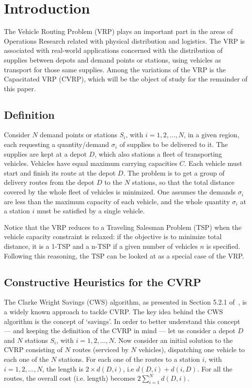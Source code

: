 \section{Introduction}
\label{sec:intro}

The Vehicle Routing Problem (VRP) plays an important part in the areas of 
Operations Research related with physical distribution and logistics. The VRP is 
associated with real-world applications concerned with the distribution of 
supplies between depots and demand points or stations, using vehicles as transport for 
those same supplies. Among the variations of the VRP is 
the Capacitated VRP (CVRP), which will be the object of study for the remainder 
of this paper.

\subsection{Definition}
\label{subsec:definition}

Consider $N$ demand points or stations $S_i$, with $i = 1, 2, ..., N$, in a 
given region, each requesting a 
quantity\slash demand $\sigma_i$ of supplies to be 
delivered to it. The supplies are kept at a depot $D$, which also stations a 
fleet of transporting vehicles. Vehicles have equal maximum carrying capacities 
$C$. Each vehicle must start and finish its route at the depot $D$. The 
problem is to get a group of delivery routes from the depot $D$ to the $N$ 
stations, so that the total distance covered by the whole fleet of 
vehicles is minimized. One assumes the demands $\sigma_i$ are less than the maximum 
capacity of each vehicle, and the whole quantity $\sigma_i$ at a station $i$ 
must be satisfied by a single vehicle.\vertbreak

Notice that the VRP reduces to a Traveling Salesman Problem (TSP) when the 
vehicle capacity constraint is relaxed: if the objective is to minimize 
total distance, it is a 1-TSP and a n-TSP if a given number of vehicles $n$ is 
specified. Following this reasoning, the TSP can be looked at as a special case 
of the VRP.

\subsection{Constructive Heuristics for the CVRP}
\label{subsec:constructive}

The Clarke Wright 
Savings (CWS) algorithm, as presented in Section 5.2.1 of~\cite{Toth2002}, 
is a widely known approach to tackle CVRP. The 
key idea behind the CWS algorithm is the concept of `savings'. In order to 
better understand this concept --- and keeping the definition of the 
CVRP in mind --- let us consider a depot $D$ and $N$ stations $S_i$, with $i = 1, 2, ..., N$. Now consider an 
initial solution to the CVRP consisting of $N$ routes (serviced by $N$ vehicles), 
dispatching one vehicle to each one of the $N$ stations. For each one of 
the routes to a station $i$, with $i = 1, 2, ..., N$, the length is 
$2 \times d(D,i)$, i.e $d(D,i) + d(i,D)$. For all the routes, the overall cost (i.e. 
length) becomes $2\sum_{i=1}^{N} d(D,i)$.\vertbreak

